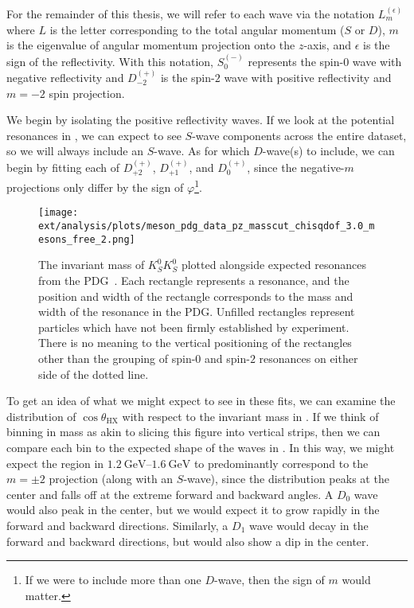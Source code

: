 For the remainder of this thesis, we will refer to each wave via the notation $L_m^{(\epsilon)}$ where $L$ is the letter corresponding to the total angular momentum ($S$ or $D$), $m$ is the eigenvalue of angular momentum projection onto the $z$-axis, and $\epsilon$ is the sign of the reflectivity. With this notation, $S_0^{(-)}$ represents the spin-$0$ wave with negative reflectivity and $D_{-2}^{(+)}$ is the spin-$2$ wave with positive reflectivity and $m=-2$ spin projection.

We begin by isolating the positive reflectivity waves. If we look at the potential resonances in , we can expect to see $S$-wave components across the entire dataset, so we will always include an $S$-wave. As for which $D$-wave(s) to include, we can begin by fitting each of $D_{+2}^{(+)}$, $D_{+1}^{(+)}$, and $D_{0}^{(+)}$, since the negative-$m$ projections only differ by the sign of $\varphi$\footnote{If we were to include more than one $D$-wave, then the sign of $m$ would matter.}.

\begin{figure}
  \begin{center}
    \texttt{[image: ext/analysis/plots/meson\_pdg\_data\_pz\_masscut\_chisqdof\_3.0\_mesons\_free\_2.png]}
  \end{center}
  \caption{The invariant mass of $K_S^0K_S^0$ plotted alongside expected resonances from the PDG~\cite{Zyla2020}. Each rectangle represents a resonance, and the position and width of the rectangle corresponds to the mass and width of the resonance in the PDG. Unfilled rectangles represent particles which have not been firmly established by experiment. There is no meaning to the vertical positioning of the rectangles other than the grouping of spin-$0$ and spin-$2$ resonances on either side of the dotted line.}\label{fig:mass-with-pdg}
\end{figure}

To get an idea of what we might expect to see in these fits, we can examine the distribution of $\cos\theta_\text{HX}$ with respect to the invariant mass in . If we think of binning in mass as akin to slicing this figure into vertical strips, then we can compare each bin to the expected shape of the waves in . In this way, we might expect the region in $\qtyrange{1.2}{1.6}{\giga\electronvolt}$ to predominantly correspond to the $m=\pm 2$ projection (along with an $S$-wave), since the distribution peaks at the center and falls off at the extreme forward and backward angles. A $D_0$ wave would also peak in the center, but we would expect it to grow rapidly in the forward and backward directions. Similarly, a $D_1$ wave would decay in the forward and backward directions, but would also show a dip in the center.

